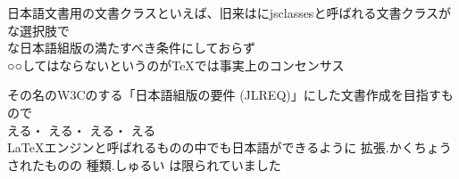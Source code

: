 日本語文書用の文書クラスといえば、旧来はにjsclassesと呼ばれる文書クラス\santen{}がな選択肢で\\

な日本語組版の満たすべき条件にしておらず\\
○○してはならないというのがTeXでは事実上のコンセンサス

その名のW3Cのする「日本語組版の要件 (JLREQ)」にした文書作成を目指すもので\\

える・%
える・%
える・%
える\\

\santen%
LaTeXエンジンと呼ばれるものの中でも日本語ができるように 拡張.かくちょう されたものの 種類.しゅるい は限られていました
